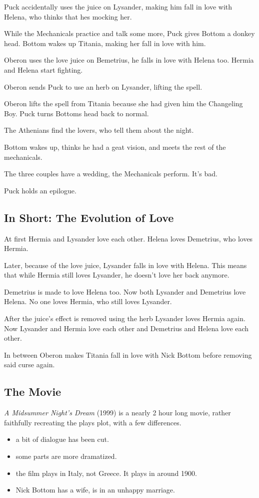\documentclass{article}
\begin{document}
Puck accidentally uses the juice on Lysander, making him fall in love with Helena, who thinks that hes mocking her.
 
While the Mechanicals practice and talk some more, Puck gives Bottom a donkey head. Bottom wakes up Titania, making her fall in love with him.
 
Oberon uses the love juice on Bemetrius, he falls in love with Helena too. Hermia and Helena start fighting.
 
Oberon sends Puck to use an herb on Lysander, lifting the spell.
 
Oberon lifts the spell from Titania because she had given him the Changeling Boy. Puck turns Bottoms head back to normal.
 
The Athenians find the lovers, who tell them about the night.
 
Bottom wakes up, thinks he had a geat vision, and meets the rest of the mechanicals.
 
The three couples have a wedding, the Mechanicals perform. It's bad.
 
Puck holds an epilogue. 
 
\subsection{In Short: The Evolution of Love} 
At first Hermia and Lysander love each other. Helena loves Demetrius, who loves Hermia.
 
Later, because of the love juice, Lysander falls in love with Helena. This means that while Hermia still loves Lysander, he doesn't love her back anymore.
 
Demetrius is made to love Helena too. Now both Lysander and Demetrius love Helena. No one loves Hermia, who still loves Lysander.
 
After the juice's effect is removed using the herb Lysander loves Hermia again. Now Lysander and Hermia love each other and Demetrius and Helena love each other. 
 
In between Oberon makes Titania fall in love with Nick Bottom before removing said curse again.
 
\subsection{The Movie}
\emph{A Midsummer Night's Dream} (1999) is a nearly 2 hour long movie, rather faithfully recreating the plays plot, with a few differences.
\begin{itemize}[label=$\cdot$]
 \item a bit of dialogue has been cut.
 \item some parts are more dramatized. 
 \item the film plays in Italy, not Greece. It plays in around 1900.
 \item Nick Bottom has a wife, is in an unhappy marriage. 
\end{itemize} 
 
\end{document}

